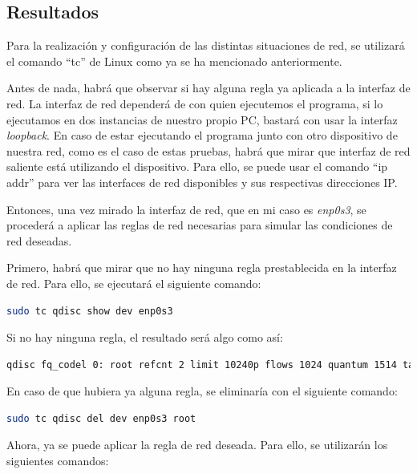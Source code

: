 \subsection{Resultados}
Para la realización y configuración de las distintas situaciones de red, se utilizará el comando ``tc'' de Linux como ya se ha mencionado anteriormente. 
\vspace{\baselineskip}

Antes de nada, habrá que observar si hay alguna regla ya aplicada a la interfaz de red. La interfaz de red dependerá de con quien ejecutemos el programa, si lo ejecutamos en dos instancias de nuestro propio PC, bastará con usar la interfaz \textit{loopback}. En caso de estar ejecutando el programa junto con otro dispositivo de nuestra red, como es el caso de estas pruebas, habrá que mirar que interfaz de red saliente está utilizando el dispositivo. Para ello, se puede usar el comando ``ip addr'' para ver las interfaces de red disponibles y sus respectivas direcciones IP. 

\vspace{\baselineskip}
Entonces, una vez mirado la interfaz de red, que en mi caso es \textit{enp0s3}, se procederá a aplicar las reglas de red necesarias para simular las condiciones de red deseadas.

\vspace{\baselineskip}

Primero, habrá que mirar que no hay ninguna regla prestablecida en la interfaz de red. Para ello, se ejecutará el siguiente comando:
\begin{lstlisting}[language=bash]
sudo tc qdisc show dev enp0s3
\end{lstlisting}
Si no hay ninguna regla, el resultado será algo como así:
\begin{lstlisting}[language=bash, breaklines=true]
qdisc fq_codel 0: root refcnt 2 limit 10240p flows 1024 quantum 1514 target 5ms interval 100ms memory_limit 32Mb ecn drop_batch 64 
\end{lstlisting}

En caso de que hubiera ya alguna regla, se eliminaría con el siguiente comando:
\begin{lstlisting}[language=bash]
sudo tc qdisc del dev enp0s3 root
\end{lstlisting}

Ahora, ya se puede aplicar la regla de red deseada. Para ello, se utilizarán los siguientes comandos:

